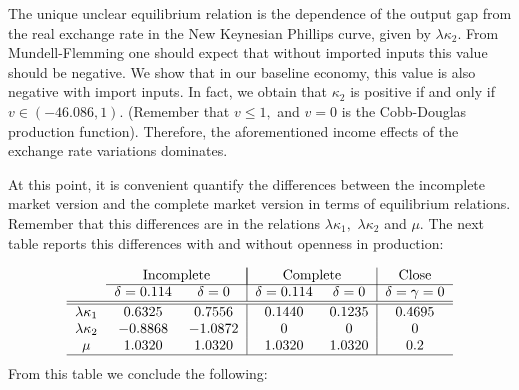 \documentclass{article}
\begin{document}
The unique unclear equilibrium relation is the dependence of the output gap
from the real exchange rate in the New Keynesian Phillips curve, given by $%
\lambda \kappa _{2}.$ From Mundell-Flemming one should expect that without
imported inputs this value should be negative. We show that in our baseline
economy, this value is also negative with import inputs. In fact, we obtain
that $\kappa _{2}$ is positive if and only if $v\in \left( -46.086,1\right)
. $ (Remember that $v\leq 1,$ and $v=0$ is the Cobb-Douglas production
function). Therefore, the aforementioned income effects of the exchange rate
variations dominates.

At this point, it is convenient quantify the differences between the
incomplete market version and the complete market version in terms of
equilibrium relations. Remember that this differences are in the relations $%
\lambda \kappa _{1},$ $\lambda \kappa _{2}$ and $\mu .$ The next table
reports this differences with and without openness in production:

\begin{equation*}
\begin{tabular}{ccc|cc|c}
& \multicolumn{2}{c|}{Incomplete} & \multicolumn{2}{|c|}{Complete} & Close
\\ \cline{2-6}
& $\delta =0.114$ & $\delta =0$ & $\delta =0.114$ & $\delta =0$ & $\delta
=\gamma =0$ \\ \hline\hline
$\lambda \kappa _{1}$ & $0.6325$ & $0.7556$ & $0.1440$ & $0.1235$ & $0.4695$
\\ 
$\lambda \kappa _{2}$ & $-0.8868$ & $-1.0872$ & $0$ & $0$ & $0$ \\ 
$\mu $ & $1.0320$ & $1.0320$ & $1.0320$ & $1.0320$ & $0.2$ \\ \hline
\end{tabular}%
\end{equation*}%
From this table we conclude the following:
\end{document}
